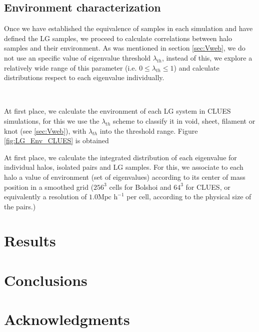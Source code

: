 \documentclass[usenatbib]{mn2e}
\begin{document}
\subsection{Environment characterization}
\label{subsec:Env_characterization}
Once we have established the equivalence of samples in each simulation and have defined the LG samples, 
we proceed to calculate correlations between halo samples and their environment. As was mentioned in 
section \ref{sec:Vweb}, we do not use an specific value of eigenvalue threshold $\lambda_{th}$, instead of 
this, we explore a relatively wide range of this parameter (i.e. $0 \leq \lambda_{th} \leq 1$) and calculate 
distributions respect to each eigenvalue individually.

\

At first place, we calculate the environment of each LG system in CLUES simulations, for this we use the 
$\lambda_{th}$ scheme to classify it in void, sheet, filament or knot (see \ref{sec:Vweb}), with $\lambda_{th}$
into the threshold range. Figure \ref{fig:LG_Env_CLUES} is obtained

At first place, we calculate the integrated distribution of each eigenvalue for individual halos, isolated 
pairs and LG samples. For this, we associate to each halo a value of environment (set of eigenvalues)
according to its center of mass position in a smoothed grid ($256^3$ cells for Bolshoi and $64^3$ for 
CLUES, or equivalently a resolution of $1.0 \mbox{Mpc h}^{-1} $ per cell, according to the physical size of
the pairs.)

\section{Results}


\section{Conclusions}
\label{sec:conclusions}
\section*{Acknowledgments}  


 
\end{document}
